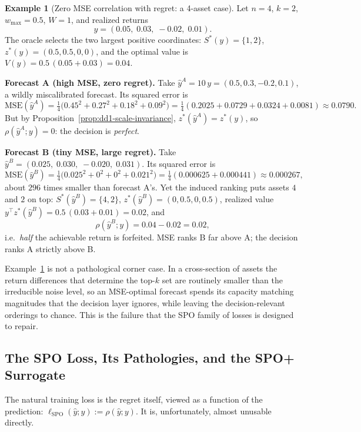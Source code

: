 \documentclass[11pt,a4paper]{article}
\theoremstyle{definition}
\newtheorem{example}{Example}[section]
\theoremstyle{plain}
\begin{document}
\begin{example}[Zero MSE correlation with regret: a 4-asset case]
\label{ex:dd1-mse-vs-regret}
Let $n = 4$, $k = 2$, $w_{\max} = 0.5$, $W = 1$, and realized returns
\[
y = (0.05,\; 0.03,\; -0.02,\; 0.01).
\]
The oracle selects the two largest positive coordinates: $S^*(y) = \{1, 2\}$,
$z^*(y) = (0.5, 0.5, 0, 0)$, and the optimal value is
$V(y) = 0.5\,(0.05 + 0.03) = 0.04$.

\textbf{Forecast A (high MSE, zero regret).} Take $\hat{y}^A = 10\,y =
(0.5, 0.3, -0.2, 0.1)$, a wildly miscalibrated forecast. Its squared error is
\[
\mathrm{MSE}(\hat{y}^A)
= \tfrac{1}{4}\bigl(0.45^2 + 0.27^2 + 0.18^2 + 0.09^2\bigr)
= \tfrac{1}{4}(0.2025 + 0.0729 + 0.0324 + 0.0081)
\approx 0.0790 .
\]
But by Proposition~\ref{prop:dd1-scale-invariance},
$z^*(\hat{y}^A) = z^*(y)$, so $\rho(\hat{y}^A; y) = 0$: the decision is
\emph{perfect}.

\textbf{Forecast B (tiny MSE, large regret).} Take
$\hat{y}^B = (0.025,\; 0.030,\; -0.020,\; 0.031)$. Its squared error is
\[
\mathrm{MSE}(\hat{y}^B)
= \tfrac{1}{4}\bigl(0.025^2 + 0^2 + 0^2 + 0.021^2\bigr)
= \tfrac{1}{4}(0.000625 + 0.000441)
\approx 0.000267,
\]
about $296$ times smaller than forecast A's. Yet the induced ranking puts
assets $4$ and $2$ on top: $S^*(\hat{y}^B) = \{4, 2\}$,
$z^*(\hat{y}^B) = (0, 0.5, 0, 0.5)$, realized value
$y^\top z^*(\hat{y}^B) = 0.5\,(0.03 + 0.01) = 0.02$, and
\[
\rho(\hat{y}^B; y) = 0.04 - 0.02 = 0.02,
\]
i.e.\ \emph{half} the achievable return is forfeited. MSE ranks B far above
A; the decision ranks A strictly above B.
\end{example}

\begin{warning}
Example~\ref{ex:dd1-mse-vs-regret} is not a pathological corner case. In a
cross-section of assets the return differences that determine the top-$k$ set
are routinely smaller than the irreducible noise level, so an MSE-optimal
forecast spends its capacity matching magnitudes that the decision layer
ignores, while leaving the decision-relevant orderings to chance. This is the
failure that the SPO family of losses is designed to repair.
\end{warning}

\subsection{The SPO Loss, Its Pathologies, and the SPO+ Surrogate}
\label{sec:dd1-spoplus}

The natural training loss is the regret itself, viewed as a function of the
prediction: $\ell_{\mathrm{SPO}}(\hat{y}; y) := \rho(\hat{y}; y)$. It is,
unfortunately, almost unusable directly.
\end{document}
